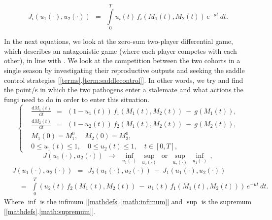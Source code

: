 \documentclass[11pt]{amsart}
\begin{document}
\begin{equation}
J_i\left(u_1(\cdot), u_2(\cdot)\right) \:\: = \:\: \int\limits_0^T u_i(t) \, f_i\left(M_1(t),
  M_2(t)\right) \, e^{-\mu t} \: dt.  \label{3}
\end{equation}


In the next equations, we look at the zero-sum two-player differential game, which describes an antagonistic game (where each player competes with each other), in line with \cite{YegorovGrognardMailleretHalkettBernhard2019,
BernhardGrognardMailleretAkhmetzhanov2010}.
We look at the competition between the two cohorts in a single season by investigating their reproductive outputs and seeking the saddle control strategies [\ref{terms}.\ref{term:saddlecontrol}]. In other words, we try and find the point/s in which the two pathogens enter a stalemate and what actions the fungi need to do in order to enter this situation.
\begin{equation}
\left\{ \begin{aligned}
& \frac{\mathrm{d} M_1(t)}{\mathrm{d} t} \:\: = \:\: \left(1 - u_1(t)\right) \,
  f_1\left(M_1(t), M_2(t)\right) \: - \: g\left(M_1(t)\right), \\
& \frac{\mathrm{d} M_2(t)}{\mathrm{d} t} \:\: = \:\: \left(1 - u_2(t)\right) \,
  f_2\left(M_1(t), M_2(t)\right) \: - \: g\left(M_2(t)\right), \\
& M_1(0) = M_1^0, \quad M_2(0) = M_2^0, \\
& 0 \leqslant u_1(t) \leqslant 1, \quad 0 \leqslant u_2(t) \leqslant 1,
  \quad t \in [0, T],
\end{aligned} \right.  \label{7}
\end{equation}
\begin{equation}
J(u_1(\cdot), u_2(\cdot)) \:\: \longrightarrow \:\: 
\inf_{u_1(\cdot)} \:  \sup_{u_2(\cdot)} 
\:\: \mbox{or} \:\:
\sup_{u_2(\cdot)} \: \inf_{u_1(\cdot)} \, ,  \label{8}
\end{equation}
\begin{equation}
\begin{aligned}
& J\left(u_1(\cdot), u_2(\cdot)\right) \:\: = \:\: J_2\left(u_1(\cdot), u_2(\cdot)\right) \: - \:
J_1\left(u_1(\cdot), u_2(\cdot)\right) \\
& \quad
= \:\: \int\limits_0^T \left( u_2(t) \, f_2(M_1(t), M_2(t)) \: - \: u_1(t)
  \, f_1(M_1(t), M_2(t)) \right) \,
e^{-\mu t} \: dt.
\end{aligned}  \label{9}
\end{equation}
Where $\inf$ is the infimum [\ref{mathdefs}.\ref{math:infimum}] and $\sup$ is the supremum [\ref{mathdefs}.\ref{math:supremum}].
\end{document}
